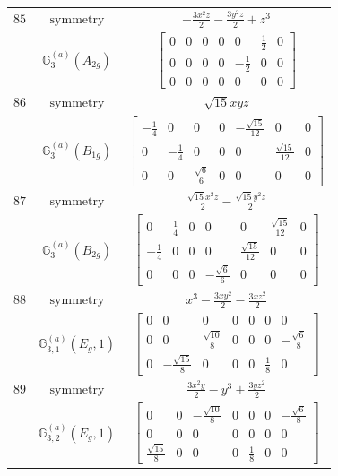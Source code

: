 \documentclass[fleqn,8pt,landscape]{jsarticle}
\begin{document}
\begin{longtable}{ccc}
$ 85 $ & $ \text{symmetry} $ & $ - \frac{3 x^{2} z}{2} - \frac{3 y^{2} z}{2} + z^{3} $ \\
$  $ & $ \mathbb{G}_{3}^{(a)}(A_{2g}) $ & $ \begin{bmatrix} 0 & 0 & 0 & 0 & 0 & \frac{1}{2} & 0 \\ 0 & 0 & 0 & 0 & - \frac{1}{2} & 0 & 0 \\ 0 & 0 & 0 & 0 & 0 & 0 & 0 \end{bmatrix} $ \\ \hline
$ 86 $ & $ \text{symmetry} $ & $ \sqrt{15} x y z $ \\
$  $ & $ \mathbb{G}_{3}^{(a)}(B_{1g}) $ & $ \begin{bmatrix} - \frac{1}{4} & 0 & 0 & 0 & - \frac{\sqrt{15}}{12} & 0 & 0 \\ 0 & - \frac{1}{4} & 0 & 0 & 0 & \frac{\sqrt{15}}{12} & 0 \\ 0 & 0 & \frac{\sqrt{6}}{6} & 0 & 0 & 0 & 0 \end{bmatrix} $ \\ \hline
$ 87 $ & $ \text{symmetry} $ & $ \frac{\sqrt{15} x^{2} z}{2} - \frac{\sqrt{15} y^{2} z}{2} $ \\
$  $ & $ \mathbb{G}_{3}^{(a)}(B_{2g}) $ & $ \begin{bmatrix} 0 & \frac{1}{4} & 0 & 0 & 0 & \frac{\sqrt{15}}{12} & 0 \\ - \frac{1}{4} & 0 & 0 & 0 & \frac{\sqrt{15}}{12} & 0 & 0 \\ 0 & 0 & 0 & - \frac{\sqrt{6}}{6} & 0 & 0 & 0 \end{bmatrix} $ \\ \hline
$ 88 $ & $ \text{symmetry} $ & $ x^{3} - \frac{3 x y^{2}}{2} - \frac{3 x z^{2}}{2} $ \\
$  $ & $ \mathbb{G}_{3,1}^{(a)}(E_{g},1) $ & $ \begin{bmatrix} 0 & 0 & 0 & 0 & 0 & 0 & 0 \\ 0 & 0 & \frac{\sqrt{10}}{8} & 0 & 0 & 0 & - \frac{\sqrt{6}}{8} \\ 0 & - \frac{\sqrt{15}}{8} & 0 & 0 & 0 & \frac{1}{8} & 0 \end{bmatrix} $ \\ \hline
$ 89 $ & $ \text{symmetry} $ & $ \frac{3 x^{2} y}{2} - y^{3} + \frac{3 y z^{2}}{2} $ \\
$  $ & $ \mathbb{G}_{3,2}^{(a)}(E_{g},1) $ & $ \begin{bmatrix} 0 & 0 & - \frac{\sqrt{10}}{8} & 0 & 0 & 0 & - \frac{\sqrt{6}}{8} \\ 0 & 0 & 0 & 0 & 0 & 0 & 0 \\ \frac{\sqrt{15}}{8} & 0 & 0 & 0 & \frac{1}{8} & 0 & 0 \end{bmatrix} $ \\ \hline

\end{longtable}
\end{document}
